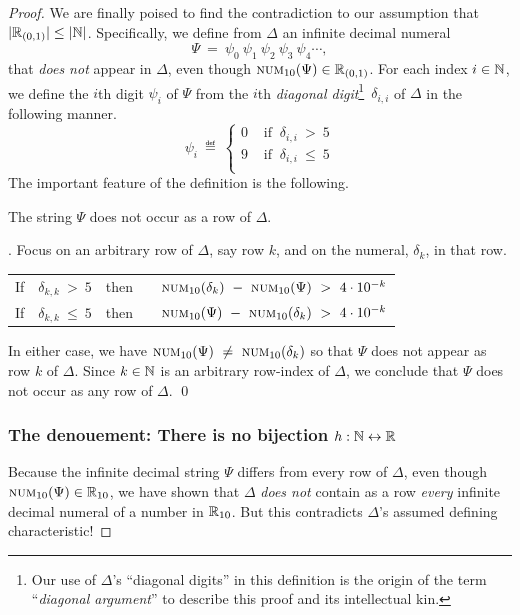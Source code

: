 \begin{proof}
We are finally poised to find the contradiction to our assumption that
$|\mathbb{R}_{(0,1)}| \leq |\mathbb{N}|$.  Specifically, we define from $\Delta$ an
infinite decimal numeral
\[ \Psi \ = \ \psi_0 \ \psi_1 \ \psi_2 \ \psi_3 \ \psi_4 \cdots, \]
that {\em does not} appear in $\Delta$, even though $\mbox{\sc
  num}_{10}(\Psi) \in \mathbb{R}_{(0,1)}$.  For each index $i \in \mathbb{N}$, we
define the $i$th digit $\psi_i$ of $\Psi$ from the $i$th {\em diagonal
  digit}\footnote{Our use of $\Delta$'s ``diagonal digits'' in this
  definition is the origin of the term ``{\em diagonal argument}'' to
  describe this proof and its intellectual kin.}~$\delta_{i,i}$ of
$\Delta$ in the following manner.
\[ \psi_i \ \eqdef \
\left\{
\begin{array}{cc}
0 & \mbox{ if } \ \delta_{i,i} \ > \ 5 \\
9 & \mbox{ if } \ \delta_{i,i} \ \leq \ 5 \\
\end{array}
\right.
\]
The important feature of the definition is the following.

\begin{lemma}
\label{lem:PSI-notin-DELTA}
The string $\Psi$ does not occur as a row of $\Delta$.
\end{lemma}

.
Focus on an arbitrary row of $\Delta$, say row $k$, and on the numeral,
$\delta_k$, in that row.

\begin{tabular}{lclc}
If & $\delta_{k,k} \ > \ 5$ & then & \ \
$\mbox{\sc num}_{10}(\delta_k) \ - \ \mbox{\sc num}_{10}(\Psi) \ > \ 4
\cdot 10^{-k}$ \\
If & $\delta_{k,k} \ \leq \ 5$ & then & \ \
$\mbox{\sc num}_{10}(\Psi) \ - \ \mbox{\sc num}_{10}(\delta_k) \ > \ 4
\cdot 10^{-k}$
\end{tabular}

\noindent
In either case, we have $\mbox{\sc num}_{10}(\Psi) \ \neq \ \mbox{\sc
  num}_{10}(\delta_k)$ so that $\Psi$ does not appear as row $k$ of
$\Delta$.  Since $k \in \mathbb{N}$ is an arbitrary row-index of $\Delta$, we
conclude that $\Psi$ does not occur as any row of $\Delta$.  \qed

\subsubsection{The denouement: There is no bijection  $h: \mathbb{N} \leftrightarrow \mathbb{R}$}

Because the infinite decimal string $\Psi$ differs from every row of
$\Delta$, even though $\mbox{\sc num}_{10}(\Psi) \in \mathbb{R}_{10}$, we have
shown that $\Delta$ {\em does not} contain as a row {\em every}
infinite decimal numeral of a number in $\mathbb{R}_{10}$.  But this
contradicts $\Delta$'s assumed defining characteristic!


\end{proof}
